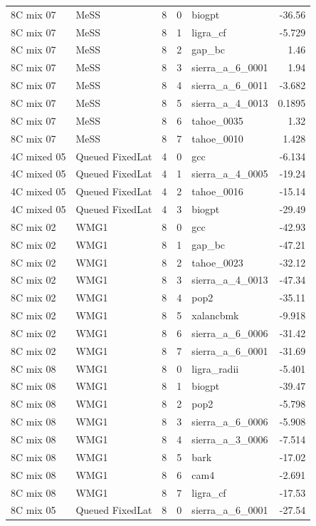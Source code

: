 \begin{tabular}{llrrlr}
8C mix 07 & MeSS & 8 & 0 & biogpt & -36.56 \\
8C mix 07 & MeSS & 8 & 1 & ligra\_cf & -5.729 \\
8C mix 07 & MeSS & 8 & 2 & gap\_bc & 1.46 \\
8C mix 07 & MeSS & 8 & 3 & sierra\_a\_6\_0001 & 1.94 \\
8C mix 07 & MeSS & 8 & 4 & sierra\_a\_6\_0011 & -3.682 \\
8C mix 07 & MeSS & 8 & 5 & sierra\_a\_4\_0013 & 0.1895 \\
8C mix 07 & MeSS & 8 & 6 & tahoe\_0035 & 1.32 \\
8C mix 07 & MeSS & 8 & 7 & tahoe\_0010 & 1.428 \\
4C mixed 05 & Queued FixedLat & 4 & 0 & gcc & -6.134 \\
4C mixed 05 & Queued FixedLat & 4 & 1 & sierra\_a\_4\_0005 & -19.24 \\
4C mixed 05 & Queued FixedLat & 4 & 2 & tahoe\_0016 & -15.14 \\
4C mixed 05 & Queued FixedLat & 4 & 3 & biogpt & -29.49 \\
8C mix 02 & WMG1 & 8 & 0 & gcc & -42.93 \\
8C mix 02 & WMG1 & 8 & 1 & gap\_bc & -47.21 \\
8C mix 02 & WMG1 & 8 & 2 & tahoe\_0023 & -32.12 \\
8C mix 02 & WMG1 & 8 & 3 & sierra\_a\_4\_0013 & -47.34 \\
8C mix 02 & WMG1 & 8 & 4 & pop2 & -35.11 \\
8C mix 02 & WMG1 & 8 & 5 & xalancbmk & -9.918 \\
8C mix 02 & WMG1 & 8 & 6 & sierra\_a\_6\_0006 & -31.42 \\
8C mix 02 & WMG1 & 8 & 7 & sierra\_a\_6\_0001 & -31.69 \\
8C mix 08 & WMG1 & 8 & 0 & ligra\_radii & -5.401 \\
8C mix 08 & WMG1 & 8 & 1 & biogpt & -39.47 \\
8C mix 08 & WMG1 & 8 & 2 & pop2 & -5.798 \\
8C mix 08 & WMG1 & 8 & 3 & sierra\_a\_6\_0006 & -5.908 \\
8C mix 08 & WMG1 & 8 & 4 & sierra\_a\_3\_0006 & -7.514 \\
8C mix 08 & WMG1 & 8 & 5 & bark & -17.02 \\
8C mix 08 & WMG1 & 8 & 6 & cam4 & -2.691 \\
8C mix 08 & WMG1 & 8 & 7 & ligra\_cf & -17.53 \\
8C mix 05 & Queued FixedLat & 8 & 0 & sierra\_a\_6\_0001 & -27.54 \\

\end{tabular}
